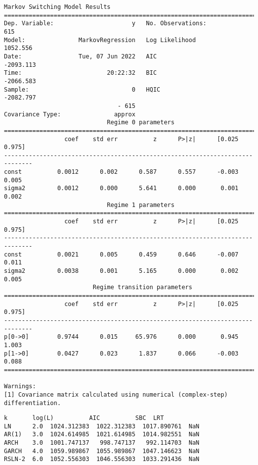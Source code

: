 \documentclass[11pt]{article}
\makeatletter
\newcommand{\boxspacing}{\kern\kvtcb@left@rule\kern\kvtcb@boxsep}
\newcommand{\prompt}[4]{
        {\ttfamily\llap{{\color{#2}[#3]:\hspace{3pt}#4}}\vspace{-\baselineskip}}
    }
\makeatother
\begin{document}
    \begin{Verbatim}[commandchars=\\\{\}]
                        Markov Switching Model Results
==============================================================================
Dep. Variable:                      y   No. Observations:                  615
Model:               MarkovRegression   Log Likelihood                1052.556
Date:                Tue, 07 Jun 2022   AIC                          -2093.113
Time:                        20:22:32   BIC                          -2066.583
Sample:                             0   HQIC                         -2082.797
                                - 615
Covariance Type:               approx
                             Regime 0 parameters
==============================================================================
                 coef    std err          z      P>|z|      [0.025      0.975]
------------------------------------------------------------------------------
const          0.0012      0.002      0.587      0.557      -0.003       0.005
sigma2         0.0012      0.000      5.641      0.000       0.001       0.002
                             Regime 1 parameters
==============================================================================
                 coef    std err          z      P>|z|      [0.025      0.975]
------------------------------------------------------------------------------
const          0.0021      0.005      0.459      0.646      -0.007       0.011
sigma2         0.0038      0.001      5.165      0.000       0.002       0.005
                         Regime transition parameters
==============================================================================
                 coef    std err          z      P>|z|      [0.025      0.975]
------------------------------------------------------------------------------
p[0->0]        0.9744      0.015     65.976      0.000       0.945       1.003
p[1->0]        0.0427      0.023      1.837      0.066      -0.003       0.088
==============================================================================

Warnings:
[1] Covariance matrix calculated using numerical (complex-step) differentiation.
    \end{Verbatim}

            \begin{tcolorbox}[breakable, size=fbox, boxrule=.5pt, pad at break*=1mm, opacityfill=0]
\prompt{Out}{outcolor}{18}{\boxspacing}
\begin{Verbatim}[commandchars=\\\{\}]
          k       log(L)          AIC          SBC  LRT
LN      2.0  1024.312383  1022.312383  1017.890761  NaN
AR(1)   3.0  1024.614985  1021.614985  1014.982551  NaN
ARCH    3.0  1001.747137   998.747137   992.114703  NaN
GARCH   4.0  1059.989867  1055.989867  1047.146623  NaN
RSLN-2  6.0  1052.556303  1046.556303  1033.291436  NaN
\end{Verbatim}
\end{tcolorbox}
        
\end{document}
